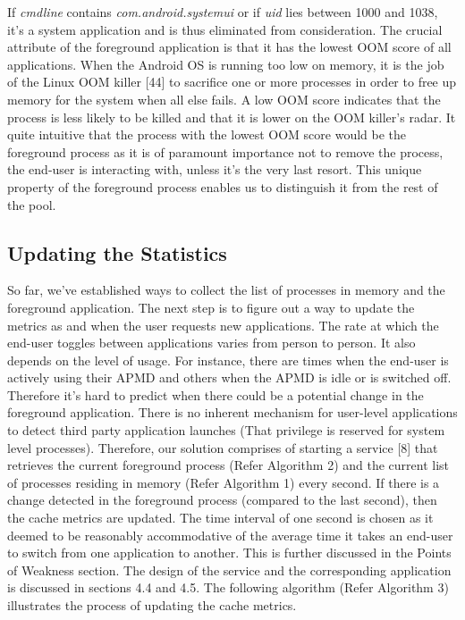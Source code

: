 \documentclass[12pt]{uthesis-v12}  %
\begin{document}
			If {\em cmdline} contains {\em com.android.systemui} or if {\em uid} lies between 1000 and 1038, it's a system application and is thus eliminated from consideration. The crucial attribute of the foreground application is that it has the lowest OOM score of all applications. When the Android OS is running too low on memory, it is the job of the Linux OOM killer [44] to sacrifice one or more processes in order to free up memory for the system when all else fails. A low OOM score indicates that the process is less likely to be killed and that it is lower on the OOM killer's radar. It quite intuitive that the process with the lowest OOM score would be the foreground process as it is of paramount importance not to remove the process, the end-user is interacting with, unless it's the very last resort. This unique property of the foreground process enables us to distinguish it from the rest of the pool. 
			
		\subsection{Updating the Statistics}
			 So far, we've established ways to collect the list of processes in memory and the foreground application. The next step is to figure out a way to update the metrics as and when the user requests new applications. The rate at which the end-user toggles between applications varies from person to person. It also depends on the level of usage. For instance, there are times when the end-user is actively using their APMD and others when the APMD is idle or is switched off. Therefore it's hard to predict when there could be a potential change in the foreground application. There is no inherent mechanism for user-level applications to detect third party application launches (That privilege is reserved for system level processes). Therefore, our solution comprises of starting a service [8] that retrieves the current foreground process (Refer Algorithm 2) and the current list of processes residing in memory (Refer Algorithm 1) every second. If there is a change detected in the foreground process (compared to the last second), then the cache metrics are updated. The time interval of one second is chosen as it deemed to be reasonably accommodative of the average time it takes an end-user to switch from one application to another. This is further discussed in the Points of Weakness section. The design of the service and the corresponding application is discussed in sections 4.4 and 4.5. The following algorithm (Refer Algorithm 3) illustrates the process of updating the cache metrics.\\     
			 
\end{document}
